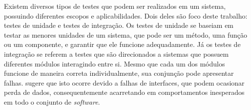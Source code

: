 Existem diversos tipos de testes que podem ser realizados em um sistema, possuindo diferentes escopos e aplicabilidades. Dois deles são foco deste trabalho: testes de unidade e testes de integração. Os testes de unidade se baseiam em testar as menores unidades de um sistema, que pode ser um método, uma função ou um componente, e garantir que ele funcione adequadamente. Já os testes de integração se referem a testes que são direcionados a sistemas que possuem diferentes módulos interagindo entre si. Mesmo que cada um dos módulos funcione de maneira correta individualmente, sua conjunção pode apresentar falhas. \cite{Pressman2021-jj} sugere que isto ocorre devido a falhas de interfaces, que podem ocasionar perda de dados, consequentemente acarretando em comportamentos inesperados em todo o conjunto de \emph{software}.